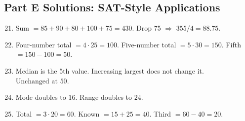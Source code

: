 \documentclass[12pt]{article}
\begin{document}
\subsection*{Part E Solutions: SAT-Style Applications}
\begin{enumerate}
  \setcounter{enumi}{20}
  \item Sum \(=85+90+80+100+75=430\). Drop 75 \(\Rightarrow\) \(355/4=\boxed{88.75}\).
  \item Four-number total \(=4\cdot25=100\). Five-number total \(=5\cdot30=150\). Fifth \(=150-100=\boxed{50}\).
  \item Median is the 5th value. Increasing largest does not change it. \(\boxed{\text{Unchanged at }50}\).
  \item Mode doubles to \(\boxed{16}\). Range doubles to \(\boxed{24}\).
  \item Total \(=3\cdot20=60\). Known \(=15+25=40\). Third \(=60-40=\boxed{20}\).
\end{enumerate}
\end{document}
